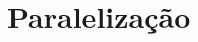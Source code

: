 \documentclass[xcolor=dvipsnames,t,aspectratio=169]{beamer}
\begin{document}





\section{Paralelização}
\end{document}
